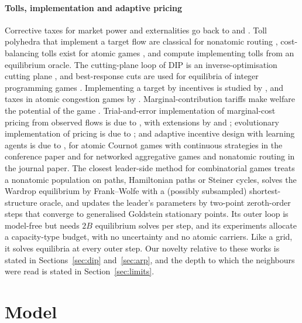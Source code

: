 \documentclass[preprint,12pt]{elsarticle}
\theoremstyle{definition}
\theoremstyle{remark}
\begin{document}
\paragraph{Tolls, implementation and adaptive pricing} Corrective taxes for market power and externalities go back to \citet{Buchanan1969} and \citet{Barnett1980}. Toll polyhedra that implement a target flow are classical for nonatomic routing \citep{Bergendorff1997,Hearn1998}, cost-balancing tolls exist for atomic games \citep{Fotakis2008}, and \citet{Bhaskar2019} compute implementing tolls from an equilibrium oracle. The cutting-plane loop of DIP is an inverse-optimisation cutting plane \citep{Ahuja2001,Wang2009,Bodur2022}, and best-response cuts are used for equilibria of integer programming games \citep{Dragotto2023,DuguetHarks2025BC,Duguet2025IPG}. Implementing a target by incentives is studied by \citet{MondererTennenholtz2004}, and taxes in atomic congestion games by \citet{CaragiannisKK2010}. Marginal-contribution tariffs make welfare the potential of the game \citep{Wolpert2001,Marden2013}. Trial-and-error implementation of marginal-cost pricing from observed flows is due to \citet{Yang2004}, with extensions by \citet{HanYang2009} and \citet{YeYangTan2015}; evolutionary implementation of pricing is due to \citet{Sandholm2002}; and adaptive incentive design with learning agents is due to \citet{Maheshwari2022,Maheshwari2026}, for atomic Cournot games with continuous strategies in the conference paper and for networked aggregative games and nonatomic routing in the journal paper. The closest leader-side method for combinatorial games \citep{Masiha2026} treats a nonatomic population on paths, Hamiltonian paths or Steiner cycles, solves the Wardrop equilibrium by Frank--Wolfe with a (possibly subsampled) shortest-structure oracle, and updates the leader's parameters by two-point zeroth-order steps that converge to generalised Goldstein stationary points. Its outer loop is model-free but needs $2B$ equilibrium solves per step, and its experiments allocate a capacity-type budget, with no uncertainty and no atomic carriers. Like a grid, it solves equilibria at every outer step. Our novelty relative to these works is stated in Sections~\ref{sec:dip} and~\ref{sec:arp}, and the depth to which the neighbours were read is stated in Section~\ref{sec:limits}.

\section{Model}\label{sec:model}
\end{document}
